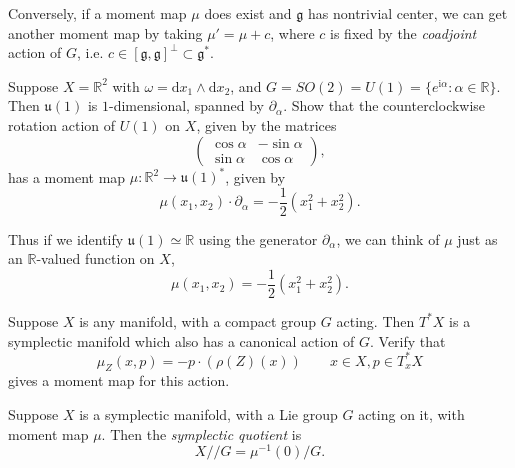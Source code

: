 \documentclass[12pt,letterpaper,reqno]{article}
\numberwithin{equation}{section}
\newcommand{\fg}{{\mathfrak g}}
\newcommand{\fu}{{\mathfrak u}}
\newcommand{\R}{\ensuremath{\mathbb R}}
\newcommand{\half}{\ensuremath{\frac{1}{2}}}
\newcommand{\kq}{/\!\!/}
\newcommand{\I}{{\mathrm i}}
\newcommand{\de}{\mathrm{d}}
\newcommand{\ti}[1]{\textit{#1}}
\begin{document}
Conversely, if a moment map $\mu$ does exist and $\fg$
has nontrivial center, we can get another moment map by taking
$\mu' = \mu + c$, where $c$ is fixed by the \ti{coadjoint}
action of $G$, i.e. $c \in [\fg,\fg]^\perp \subset \fg^*$.

\begin{exercise}
Suppose $X = \R^2$ with $\omega = \de x_1 \wedge \de x_2$, and
$G = SO(2) = U(1) = \{e^{\I \alpha}: \alpha \in \R \}$.
Then $\fu(1)$ is $1$-dimensional, spanned by $\partial_\alpha$.
Show that the counterclockwise rotation action of $U(1)$ on $X$,
given by the matrices
\begin{equation}
   \begin{pmatrix} \cos \alpha & - \sin \alpha \\ \sin \alpha & \cos \alpha \end{pmatrix},
 \end{equation}
has a moment map $\mu: \R^2 \to \fu(1)^*$, given by
\begin{equation}
  \mu(x_1,x_2) \cdot \partial_\alpha = -\half (x_1^2 + x_2^2).
\end{equation}
\end{exercise}
Thus if we identify $\fu(1) \simeq \R$ using the generator
$\partial_\alpha$, we can think of $\mu$ just as an $\R$-valued function
on $X$,
\begin{equation}
  \mu(x_1,x_2) = -\half (x_1^2 + x_2^2).
\end{equation}

\begin{exercise} \label{exc:cotangent-moment-map}
Suppose $X$ is any manifold, with a compact
group $G$ acting. Then $T^* X$ is a symplectic manifold
which also has a canonical action of $G$. Verify that
\begin{equation}
  \mu_Z(x,p) = -p \cdot (\rho(Z)(x)) \qquad x \in X, p \in T^*_x X
\end{equation}
gives a moment map for this action.
\end{exercise}

\begin{defn} \label{def:symplectic-quotient} \cite{MR0402819}
Suppose $X$ is a symplectic manifold, with a Lie group $G$
acting on it, with moment map $\mu$. Then the \ti{symplectic quotient}
is
\begin{equation}
  X \kq G = \mu^{-1}(0) / G.
\end{equation}
\end{defn}
\end{document}
